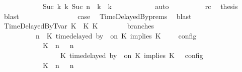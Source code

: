 \begin{isabellebody}
\ \ \ \ \ \ \ \ \ \ \ \ {\isasymhookrightarrow}\isactrlbsup Suc\ k\isactrlesup \ {\isacharparenleft}{\isasymGamma}\isactrlsub k{\isacharcomma}\ Suc\ n\ {\isasymturnstile}\ {\isasymPsi}\isactrlsub k\ {\isasymtriangleright}\ {\isasymPhi}\isactrlsub k{\isacharparenright}{\isacartoucheclose}\isanewline
\ \ \ \ \ \ \ \ \ \ \isamarkupfalse%
\ auto\isanewline
\ \ \ \ \ \ \ \ \isamarkupfalse%
\ rc\ \isamarkupfalse%
\ {\isacharquery}thesis\ \isamarkupfalse%
\ blast\isanewline
\ \ \ \ \ \ \isamarkupfalse%
\isanewline
\ \ \ \ \ \ \isamarkupfalse%
\ \isamarkupfalse%
\ {\isacharquery}case\ \isamarkupfalse%
\ TimeDelayedBy{\isachardot}prems{\isacharparenleft}{}{\isacharparenright}\ \isamarkupfalse%
\ blast\isanewline
\ \ \isamarkupfalse%
\isanewline
\ \ \ \ \isamarkupfalse%
\ {\isacharparenleft}TimeDelayedByTvar\ K\ {\isasymdelta}{\isasymtau}\ K\ K\isanewline
\ \ \ \ \ \ \isamarkupfalse%
\ branches{\isacharcolon}\isanewline
\ \ \ \ \ \ \ \ {\isacartoucheopen}{\isasymlbrakk}\ {\isasymGamma}{\isacharcomma}\ n\ {\isasymturnstile}\ {\isacharparenleft}{\isacharparenleft}K\ time{\isacharminus}delayed{\isasymsharp}\ by\ {\isasymdelta}{\isasymtau}\ on\ K\ implies\ K\ {\isacharhash}\ {\isasymPsi}{\isacharparenright}\ {\isasymtriangleright}\ {\isasymPhi}\ {\isasymrbrakk}\isactrlsub c\isactrlsub o\isactrlsub n\isactrlsub f\isactrlsub i\isactrlsub g\isanewline
\ \ \ \ \ \ \ \ \ \ {\isacharequal}\ {\isasymlbrakk}\ {\isacharparenleft}{\isacharparenleft}K\ {\isasymnot}{\isasymUp}\ n{\isacharparenright}\ {\isacharhash}\ {\isasymGamma}{\isacharparenright}{\isacharcomma}\ n\isanewline
\ \ \ \ \ \ \ \ \ \ \ \ \ \ {\isasymturnstile}\ {\isasymPsi}\ {\isasymtriangleright}\ {\isacharparenleft}{\isacharparenleft}K\ time{\isacharminus}delayed{\isasymsharp}\ by\ {\isasymdelta}{\isasymtau}\ on\ K\ implies\ K\ {\isacharhash}\ {\isasymPhi}{\isacharparenright}\ {\isasymrbrakk}\isactrlsub c\isactrlsub o\isactrlsub n\isactrlsub f\isactrlsub i\isactrlsub g\isanewline
\ \ \ \ \ \ \ \ \ \ {\isasymunion}\ {\isasymlbrakk}\ {\isacharparenleft}{\isacharparenleft}K\ {\isasymUp}\ n{\isacharparenright}\ {\isacharhash}\ {\isasymGamma}{\isacharparenright}{\isacharcomma}\ n\isanewline

\end{isabellebody}
